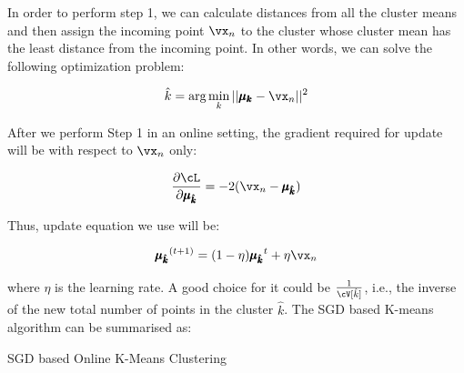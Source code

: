 \documentclass[a4paper,11pt]{article}
\begin{document}
\begin{mlsolution}

In order to perform step 1, we can calculate distances from all the cluster means and then assign the incoming point $\vx_n$ to the cluster whose cluster mean has the least distance from the incoming point. In other words, we can solve the following optimization problem:

\begin{equation*}
    \hat{k} = \text{arg} \min\limits_k ||\pmb{\mu_k} - \vx_n||^2
\end{equation*}

After we perform Step 1 in an online setting, the gradient required for update will be with respect to $\vx_n$ only:

\begin{equation*}
    \frac{\partial \cL}{\partial \pmb{\mu_{\hat{k}}}} = -2(\vx_n - \pmb{\mu_{\hat{k}}})
\end{equation*}

Thus, update equation we use will be:

\begin{equation*}
    \pmb{\mu_{\hat{k}}}^{(t+1)} = (1-\eta)\pmb{\mu_{\hat{k}}}^{t} + \eta\vx_n
\end{equation*}

where $\eta$ is the learning rate. A good choice for it could be $\frac{1}{\cV[\hat{k}]}$, i.e., the inverse of the new total number of points in the cluster $\hat{k}$. The SGD based K-means algorithm can be summarised as:\\

\begin{algorithm}[H]
    \DontPrintSemicolon
    \SetAlgoLined
    \caption{SGD based Online K-Means Clustering}
\end{algorithm}


\end{mlsolution}
\end{document}
